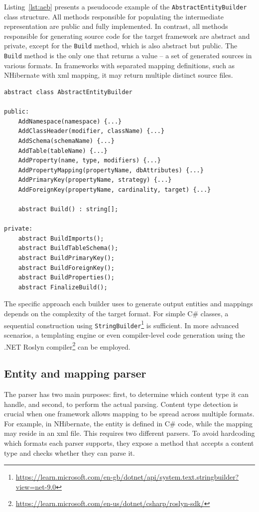 Listing~\ref{lst:aeb} presents a pseudocode example of the \texttt{AbstractEntityBuilder} class structure. All methods responsible for populating the intermediate representation are public and fully implemented. In contrast, all methods responsible for generating source code for the target framework are abstract and private, except for the \texttt{Build} method, which is also abstract but public. The \texttt{Build} method is the only one that returns a value -- a set of generated sources in various formats. In frameworks with separated mapping definitions, such as NHibernate with \acrshort{xml} mapping, it may return multiple distinct source files. 

 \begin{lstlisting}[caption={AbstractEntityBuilder class structure}, language=pseudo, label={lst:aeb}]
abstract class AbstractEntityBuilder
    
public: 
    AddNamespace(namespace) {...}
    AddClassHeader(modifier, className) {...}
    AddSchema(schemaName) {...}
    AddTable(tableName) {...}
    AddProperty(name, type, modifiers) {...}
    AddPropertyMapping(propertyName, dbAttributes) {...}
    AddPrimaryKey(propertyName, strategy) {...}
    AddForeignKey(propertyName, cardinality, target) {...}
    
    abstract Build() : string[];

private: 
    abstract BuildImports();
    abstract BuildTableSchema();
    abstract BuildPrimaryKey();
    abstract BuildForeignKey();
    abstract BuildProperties();
    abstract FinalizeBuild();
 \end{lstlisting}

 The specific approach each builder uses to generate output entities and mappings depends on the complexity of the target format. For simple C\# classes, a sequential construction using \texttt{StringBuilder}\footnote{\url{https://learn.microsoft.com/en-gb/dotnet/api/system.text.stringbuilder?view=net-9.0}} is sufficient. In more advanced scenarios, a templating engine or even compiler-level code generation using the .NET Roslyn compiler\footnote{\url{https://learn.microsoft.com/en-us/dotnet/csharp/roslyn-sdk/}} can be employed.

\subsection{Entity and mapping parser}
The parser has two main purposes: first, to determine which content type it can handle, and second, to perform the actual parsing. Content type detection is crucial when one framework allows mapping to be spread across multiple formats. For example, in NHibernate, the entity is defined in C\# code, while the mapping may reside in an \acrshort{xml} file. This requires two different parsers. To avoid hardcoding which formats each parser supports, they expose a method that accepts a content type and checks whether they can parse it.

